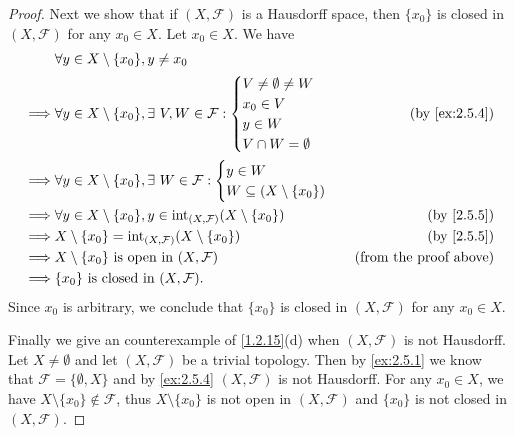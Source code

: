 \begin{proof}
  Next we show that if \((X, \mathcal{F})\) is a Hausdorff space, then \(\{x_0\}\) is closed in \((X, \mathcal{F})\) for any \(x_0 \in X\).
  Let \(x_0 \in X\).
  We have
  \begin{align*}
             & \forall y \in X \setminus \{x_0\}, y \neq x_0                                                                               \\
    \implies & \forall y \in X \setminus \{x_0\}, \exists\ V, W \in \mathcal{F} : \begin{cases}
                                                                                    V \neq \emptyset \neq W \\
                                                                                    x_0 \in V               \\
                                                                                    y \in W                 \\
                                                                                    V \cap W = \emptyset
                                                                                  \end{cases}            & \text{(by \cref{ex:2.5.4})}     \\
    \implies & \forall y \in X \setminus \{x_0\}, \exists\ W \in \mathcal{F} : \begin{cases}
                                                                                 y \in W \\
                                                                                 W \subseteq (X \setminus \{x_0\})
                                                                               \end{cases}                            \\
    \implies & \forall y \in X \setminus \{x_0\}, y \in \text{int}_{(X, \mathcal{F})}(X \setminus \{x_0\}) & \text{(by \cref{2.5.5})}      \\
    \implies & X \setminus \{x_0\} = \text{int}_{(X, \mathcal{F})}(X \setminus \{x_0\})                    & \text{(by \cref{2.5.5})}      \\
    \implies & X \setminus \{x_0\} \text{ is open in } (X, \mathcal{F})                                    & \text{(from the proof above)} \\
    \implies & \{x_0\} \text{ is closed in } (X, \mathcal{F}).
  \end{align*}
  Since \(x_0\) is arbitrary, we conclude that \(\{x_0\}\) is closed in \((X, \mathcal{F})\) for any \(x_0 \in X\).

  Finally we give an counterexample of \cref{1.2.15}(d) when \((X, \mathcal{F})\) is not Hausdorff.
  Let \(X \neq \emptyset\) and let \((X, \mathcal{F})\) be a trivial topology.
  Then by \cref{ex:2.5.1} we know that \(\mathcal{F} = \{\emptyset, X\}\) and by \cref{ex:2.5.4} \((X, \mathcal{F})\) is not Hausdorff.
  For any \(x_0 \in X\), we have \(X \setminus \{x_0\} \notin \mathcal{F}\), thus \(X \setminus \{x_0\}\) is not open in \((X, \mathcal{F})\) and \(\{x_0\}\) is not closed in \((X, \mathcal{F})\).
\end{proof}

